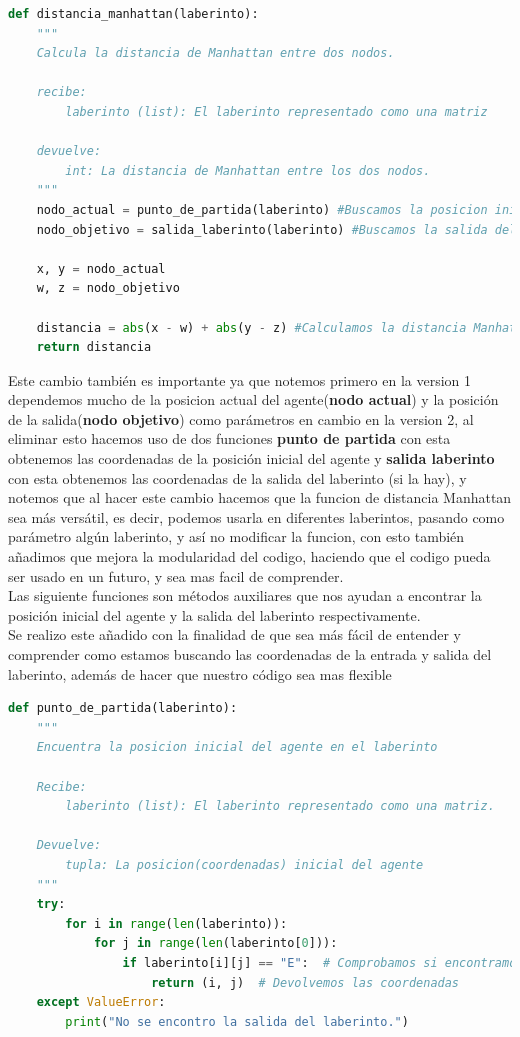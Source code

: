 \begin{lstlisting}[language=Python, caption=Version 2: distanciamanhattan]
    def distancia_manhattan(laberinto):
    """
    Calcula la distancia de Manhattan entre dos nodos.

    recibe:
        laberinto (list): El laberinto representado como una matriz

    devuelve:
        int: La distancia de Manhattan entre los dos nodos.
    """
    nodo_actual = punto_de_partida(laberinto) #Buscamos la posicion inicial del agente
    nodo_objetivo = salida_laberinto(laberinto) #Buscamos la salida del laberinto

    x, y = nodo_actual 
    w, z = nodo_objetivo
    
    distancia = abs(x - w) + abs(y - z) #Calculamos la distancia Manhattan dados dos puntos
    return distancia
\end{lstlisting}

Este cambio también es importante ya que notemos primero en la version 1 dependemos mucho de la 
posicion actual del agente(\textbf{nodo actual}) y la posición de la salida(\textbf{nodo objetivo}) 
como parámetros en cambio en la version 2, al eliminar esto hacemos uso de dos funciones 
\textbf{punto de partida} con esta obtenemos las coordenadas de la posición inicial del agente y 
\textbf{salida laberinto} con esta obtenemos las coordenadas de la salida del laberinto (si la hay),
y notemos que al hacer este cambio hacemos que la funcion de distancia Manhattan sea más versátil, 
es decir, podemos usarla en diferentes laberintos, pasando como parámetro algún laberinto, y así 
no modificar la funcion, con esto también añadimos que mejora la modularidad del codigo, 
haciendo que el codigo pueda ser usado en un futuro, y sea mas facil de comprender. \\ 

Las siguiente funciones son métodos auxiliares que nos ayudan a encontrar la posición inicial del 
agente y la salida del laberinto respectivamente.\\ 

Se realizo este añadido con la finalidad de que sea más fácil de entender y comprender como estamos 
buscando las coordenadas de la entrada y salida del laberinto, además de hacer que nuestro 
código sea mas flexible

\begin{lstlisting}[language=Python, caption=Función auxiliar: puntodepartida]
    def punto_de_partida(laberinto):
    """
    Encuentra la posicion inicial del agente en el laberinto

    Recibe:
        laberinto (list): El laberinto representado como una matriz.

    Devuelve:
        tupla: La posicion(coordenadas) inicial del agente
    """
    try:
        for i in range(len(laberinto)):
            for j in range(len(laberinto[0])):
                if laberinto[i][j] == "E":  # Comprobamos si encontramos la entrada
                    return (i, j)  # Devolvemos las coordenadas 
    except ValueError:
        print("No se encontro la salida del laberinto.")
\end{lstlisting}

